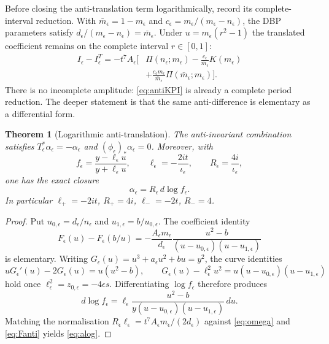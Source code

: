 \documentclass[11pt,a4paper]{article}
\newtheorem{theorem}{Theorem}[section]
\theoremstyle{definition}
\theoremstyle{remark}
\begin{document}
Before closing the anti-translation term logarithmically, record its
complete-interval reduction. With \(\bar m_\epsilon=1-m_\epsilon\) and
\(c_\epsilon=m_\epsilon/(m_\epsilon-n_\epsilon)\), the DBP parameters satisfy
\(d_\epsilon/(m_\epsilon-n_\epsilon)=\bar m_\epsilon\). Under
\(u=m_\epsilon(r^2-1)\) the translated coefficient remains on the complete
interval \(r\in[0,1]\):
\begin{equation}
\begin{aligned}
I_\epsilon-I_\epsilon^T
=
-t^7A_\epsilon
\Biggl[
&\Pi(n_\epsilon;m_\epsilon)
-\frac{c_\epsilon}{\bar m_\epsilon}K(m_\epsilon)\\
&+
\frac{c_\epsilon m_\epsilon}{\bar m_\epsilon}
\Pi(\bar m_\epsilon;m_\epsilon)
\Biggr].
\end{aligned}
\label{eq:antiKPI}
\end{equation}
There is no incomplete amplitude: \eqref{eq:antiKPI} is already a complete
period reduction. The deeper statement is that the same anti-difference is
elementary as a differential form.

\begin{theorem}[Logarithmic anti-translation]
\label{thm:anti}
The anti-invariant combination satisfies \(T_\epsilon^*\alpha_\epsilon=-\alpha_\epsilon\)
and \((\phi_\epsilon)_*\alpha_\epsilon=0\). Moreover, with
\begin{equation}
f_\epsilon=\frac{y-\ell_\epsilon u}{y+\ell_\epsilon u},
\qquad
\ell_\epsilon=-\frac{2it}{\iota_\epsilon},
\qquad
R_\epsilon=\frac{4i}{\iota_\epsilon},
\label{eq:feps}
\end{equation}
one has the exact closure
\begin{equation}
\boxed{\alpha_\epsilon=R_\epsilon\,d\log f_\epsilon.}
\label{eq:alog}
\end{equation}
In particular \(\ell_+=-2it\), \(R_+=4i\), \(\ell_-=-2t\), \(R_-=4\).
\end{theorem}

\begin{proof}
Put \(u_{0,\epsilon}=d_\epsilon/n_\epsilon\) and \(u_{1,\epsilon}=b/u_{0,\epsilon}\).
The coefficient identity
\begin{equation}
F_\epsilon(u)-F_\epsilon(b/u)
=
-\frac{A_\epsilon m_\epsilon}{d_\epsilon}
\frac{u^2-b}{(u-u_{0,\epsilon})(u-u_{1,\epsilon})}
\label{eq:Fanti}
\end{equation}
is elementary. Writing \(G_\epsilon(u)=u^3+a_\epsilon u^2+bu=y^2\), the curve
identities
\[
uG_\epsilon'(u)-2G_\epsilon(u)=u(u^2-b),
\qquad
G_\epsilon(u)-\ell_\epsilon^2u^2
=
u(u-u_{0,\epsilon})(u-u_{1,\epsilon})
\]
hold once \(\ell_\epsilon^2=z_{0,\epsilon}=-4\epsilon s\). Differentiating
\(\log f_\epsilon\) therefore produces
\[
d\log f_\epsilon
=
\ell_\epsilon
\frac{u^2-b}{y(u-u_{0,\epsilon})(u-u_{1,\epsilon})}\,du.
\]
Matching the normalisation
\(R_\epsilon\ell_\epsilon=t^7A_\epsilon m_\epsilon/(2d_\epsilon)\) against
\eqref{eq:omega} and \eqref{eq:Fanti} yields \eqref{eq:alog}.
\end{proof}
\end{document}
